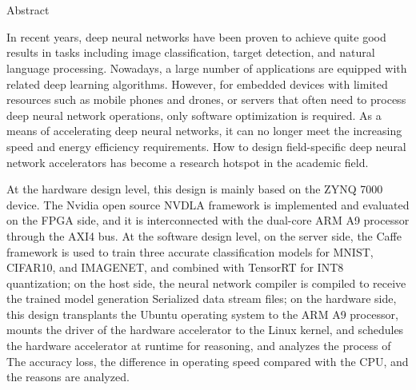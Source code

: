 \chapter[Abstract]{\MyTitleEn}

\begin{center}
\vspace{-0.3cm}
 \songti Abstract
\vspace{0.3cm}
\end{center}

In recent years, deep neural networks have been proven to achieve quite good results in tasks including image classification, target detection, and natural language processing. Nowadays, a large number of applications are equipped with related deep learning algorithms. However, for embedded devices with limited resources such as mobile phones and drones, or servers that often need to process deep neural network operations, only software optimization is required. As a means of accelerating deep neural networks, it can no longer meet the increasing speed and energy efficiency requirements. How to design field-specific deep neural network accelerators has become a research hotspot in the academic field.

At the hardware design level, this design is mainly based on the ZYNQ 7000 device. The Nvidia open source NVDLA framework is implemented and evaluated on the FPGA side, and it is interconnected with the dual-core ARM A9 processor through the AXI4 bus. At the software design level, on the server side, the Caffe framework is used to train three accurate classification models for MNIST, CIFAR10, and IMAGENET, and combined with TensorRT for INT8 quantization; on the host side, the neural network compiler is compiled to receive the trained model generation Serialized data stream files; on the hardware side, this design transplants the Ubuntu operating system to the ARM A9 processor, mounts the driver of the hardware accelerator to the Linux kernel, and schedules the hardware accelerator at runtime for reasoning, and analyzes the process of The accuracy loss, the difference in operating speed compared with the CPU, and the reasons are analyzed.


